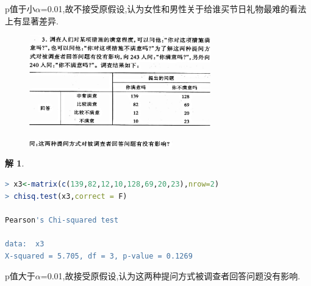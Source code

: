 \documentclass[11pt,a4paper]{ctexart}
\newtheorem*{solution}{解}
\begin{document}
p值于小$ \alpha $=0.01,故不接受原假设,认为女性和男性关于给谁买节日礼物最难的看法上有显著差异.\\
\begin{figure}[H]
	\centering
	\includegraphics[width=0.7\textwidth]{screenshot005}
	\label{fig:screenshot005}
\end{figure}
\begin{figure}[H]
	\centering
	\includegraphics[width=0.7\textwidth]{screenshot003}
	\label{fig:screenshot003}
\end{figure}
\begin{solution}
\end{solution}
\begin{lstlisting}[language=r]
> x3<-matrix(c(139,82,12,10,128,69,20,23),nrow=2)
> chisq.test(x3,correct = F)

Pearson's Chi-squared test

data:  x3
X-squared = 5.705, df = 3, p-value = 0.1269
\end{lstlisting}

p值大于$ \alpha $=0.01,故接受原假设,认为这两种提问方式被调查者回答问题没有影响.\\
\end{document}
